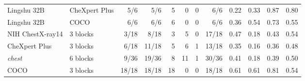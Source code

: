 \documentclass{article}
\providecommand{\DIFaddendFL}{} %
\DeclareRobustCommand{\DIFaddendFL}{\DIFOaddendFL \let\includegraphics\DIFOincludegraphics} %
\begin{document}
\begin{table}[h]
{\begin{tabular}{llrrrrrrrrrr}
Lingshu 32B & CheXpert Plus & 5/6 & 5/6 & 5 & 0 & 0 & 6/6 & 0.22 & 0.33 & 0.87 & 0.80 \\
Lingshu 32B & COCO & 6/6 & 6/6 & 6 & 0 & 0 & 6/6 & 0.36 & 0.54 & 0.73 & 0.55 \\
\midrule
NIH ChestX-ray14 & 3 blocks & 3/18 & 8/18 & 3 & 5 & 0 & 17/18 & 0.47 & 0.18 & 0.43 & 0.54 \\
CheXpert Plus & 3 blocks & 6/18 & 11/18 & 5 & 6 & 1 & 13/18 & 0.35 & 0.16 & 0.36 & 0.48 \\
\textit{chest} & 6 blocks & 9/36 & 19/36 & 8 & 11 & 1 & 30/36 & 0.41 & 0.18 & 0.39 & 0.50 \\
COCO & 3 blocks & 18/18 & 18/18 & 18 & 0 & 0 & 18/18 & 0.61 & 0.61 & 0.81 & 0.54 \\
\bottomrule
\end{tabular}}
\DIFaddendFL 


\end{table}
\end{document}

